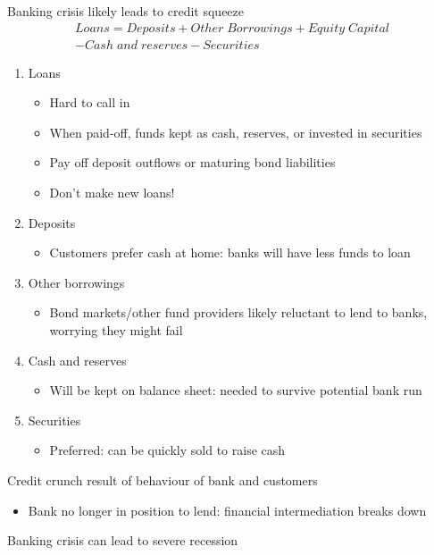 \documentclass{beamer}
\begin{document}
\begin{frame}  
Banking crisis likely leads to credit squeeze
\begin{align*}
  Loans= Deposits + Other\;Borrowings + Equity\;Capital\\
  - Cash\;and\;reserves -   Securities
\end{align*}
\end{frame}

\begin{frame}
  \begin{enumerate}
  \item Loans
  \begin{itemize}
    \item Hard to call in
    \item When paid-off, funds kept as cash, reserves, or invested in securities
    \item Pay off deposit outflows or maturing bond liabilities
    \item Don't make new loans!
  \end{itemize}
  \item Deposits
  \begin{itemize}
    \item Customers prefer cash at home: banks will have less funds to loan
  \end{itemize}
  \item Other borrowings
  \begin{itemize}
    \item Bond markets/other fund providers likely reluctant to lend to banks, worrying they might fail    
  \end{itemize}
  \item Cash and reserves
  \begin{itemize}
    \item Will be kept on balance sheet: needed to survive potential bank run
  \end{itemize}
  \item Securities
  \begin{itemize}
    \item Preferred: can be quickly sold to raise cash
  \end{itemize}
\end{enumerate} 
\end{frame}

\begin{frame}
  Credit crunch result of behaviour of bank and customers
  \begin{itemize}
    \item Bank no longer in position to lend: financial intermediation breaks down
  \end{itemize}
  \medskip
  Banking crisis can lead to severe recession
\end{frame}
\end{document}

